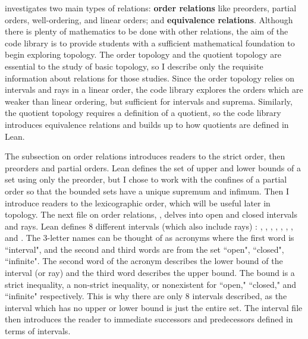 investigates two main types of relations: 
\textbf{order relations} like preorders, partial orders, well-ordering, 
and linear orders; and \textbf{equivalence relations}. Although there is 
plenty of mathematics to be done with other relations, the aim of the code library is to
provide students with a sufficient mathematical foundation to begin exploring topology.
The order topology and the quotient topology are essential to the study of basic topology, 
so I describe only the requisite information about relations for those studies. Since the order 
topology relies on intervals and rays in a linear order, the code library explores the orders
which are weaker than linear ordering, but sufficient for intervals and suprema. Similarly, 
the quotient topology requires a definition of a quotient, so the code library introduces equivalence
relations and builds up to how quotients are defined in Lean.

The subsection on order relations introduces readers to the strict order, then preorders
and partial orders. Lean defines the set of upper and lower bounds of a set using only 
the preorder, but I chose to work with the confines of a partial order so that the 
bounded sets have a unique supremum and infimum. Then I introduce readers to the lexicographic
order, which will be useful later in topology. The next file on order relations, , delves into 
open and closed intervals and rays. Lean defines 8 different intervals (which also include rays) : 
, , , , , , , and .
The 3-letter names can be thought of as acronyms where the first word is ``interval", and the 
second and third words are from the set {``open", ``closed", ``infinite"}. The second word of the 
acronym describes the lower bound of the interval (or ray) and the third word describes the 
upper bound. The bound is a strict inequality, a non-strict inequality, or nonexistent for
``open," ``closed," and ``infinite" respectively. This is why there are only 8 intervals described, 
as the interval which has no upper or lower bound is just the entire set. The interval file then
introduces the reader to immediate successors and predecessors defined in terms of intervals.


